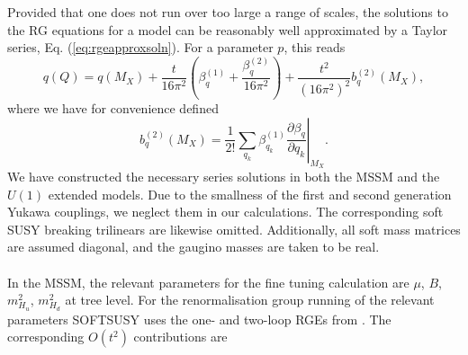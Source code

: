 \documentclass[preprint,amsmath,amssymb,aps,superscriptaddress,prd,showpacs,floatfix,nofootinbib]{revtex4-1}
\begin{document}
Provided that one does not run over too large a range of scales, the
solutions to the RG equations for a model can be reasonably well
approximated by a Taylor series, Eq. (\ref{eq:rgeapproxsoln}).  For a
parameter $p$, this reads
\begin{equation*}
q(Q)=q(M_X)+\frac{t}{16\pi^2}\left ( \beta_q^{(1)}+\frac{\beta_q^{(2)}}{16\pi^2}\right )+\frac{t^2}{(16\pi^2)^2}b_q^{(2)}(M_X),
\end{equation*}
where we have for convenience defined
\begin{equation*}
b_q^{(2)}(M_X)=\frac{1}{2!}\left . \sum_{q_k}\beta_{q_k}^{(1)}\frac{\partial \beta_q}{\partial q_k}\right |_{M_X}.
\end{equation*}
We have constructed the necessary series solutions in both the MSSM
and the $U(1)$ extended models. Due to the smallness of the first and
second generation Yukawa couplings, we neglect them in our
calculations. The corresponding soft SUSY breaking trilinears are
likewise omitted. Additionally, all soft mass matrices are assumed
diagonal, and the gaugino masses are taken to be real.\\ \\ In the
MSSM, the relevant parameters for the fine tuning calculation are
$\mu$, $B$, $m_{H_u}^2$, $m_{H_d}^2$ at tree level. For the
renormalisation group running of the relevant parameters
SOFTSUSY uses the one- and two-loop RGEs from
\cite{Barger:1993gh,Martin:1993zk}. The corresponding $O(t^2)$
contributions are
\end{document}
